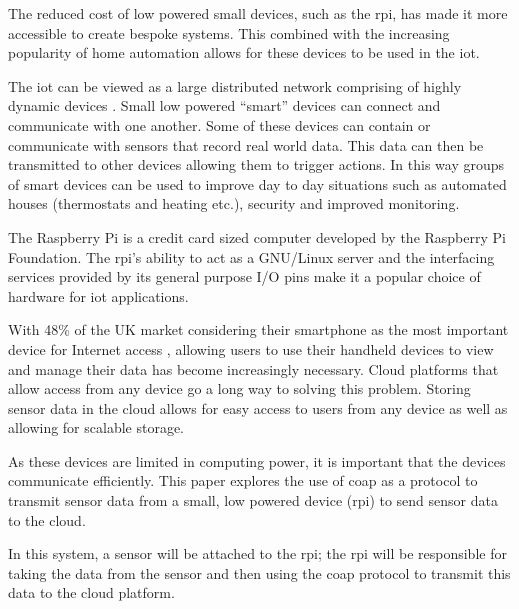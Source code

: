 The reduced cost of low powered small devices, such as the \gls{rpi}, has made it 
more accessible to create bespoke systems. 
This combined with the increasing popularity of home automation allows for these 
devices to be used in the \gls{iot}.

The \gls{iot} can be viewed as a large distributed network comprising of highly 
dynamic devices \citep{miorandi_internet_2012}. Small low powered ``smart'' devices 
can connect and communicate with one another. Some of these devices can contain or 
communicate with sensors that record real world data. This data can then be 
transmitted to other devices allowing them to trigger actions. In this way groups 
of smart devices can be used to improve day to day situations such as automated 
houses (thermostats and heating etc.), security and improved monitoring.

The Raspberry Pi \citep{pi_model_2018} is a credit card sized 
computer developed by the Raspberry Pi Foundation. 
The \gls{rpi}'s ability to act as a GNU/Linux server and the interfacing services 
provided by its general purpose I/O pins make it a popular 
choice of hardware for \gls{iot} applications. \citep{kumar_iot_2016}

With 48\% of the UK market considering their smartphone as the most important 
device for Internet access \citep{ofcom_communications_2018}, allowing users to use 
their handheld devices to view and manage their data has become increasingly 
necessary. Cloud platforms that allow access from any device go a long way to 
solving this problem. Storing sensor data in the cloud allows for easy access to 
users from any device as well as allowing for scalable storage.

As these devices are limited in computing power, it is important that the devices 
communicate efficiently. 
This paper explores the use of \gls{coap} as a protocol to transmit sensor data 
from a small, low powered device (\gls{rpi}) to send sensor data to the cloud.

In this system, a sensor will be attached to the \gls{rpi}; the \gls{rpi} will 
be responsible for taking the data from the sensor and then 
using the \gls{coap} protocol to transmit this data to the cloud platform.